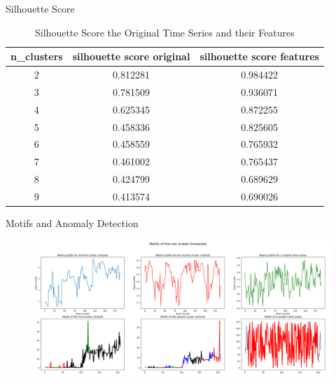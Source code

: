 

\begin{frame}{Silhouette Score}

    \begin{table}[htbp]
        \centering
        \begin{tabular}{|c|c|c|}
          \hline
          \textbf{n\_clusters} & \textbf{silhouette score original} & \textbf{silhouette score features}\\
          \hline
          2 & 0.812281 & 0.984422 \\
          3 & 0.781509 & 0.936071 \\
          4 & 0.625345 & 0.872255 \\
          5 & 0.458336 & 0.825605 \\
          6 & 0.458559 & 0.765932 \\
          7 & 0.461002 & 0.765437 \\
          8 & 0.424799 & 0.689629 \\
          9 & 0.413574 & 0.690026 \\
          \hline
        \end{tabular}
        \label{Silhouette Score for the different Scaling}
        \caption{Silhouette Score the Original Time Series and their Features}
      \end{table}      

\end{frame}
        



\begin{frame}{Motifs and Anomaly Detection}

    \begin{figure}
        \centering
        \includegraphics[width=.99\textwidth]{img/ts/Motifs.png}
      
        \label{MOT}
    \end{figure}
    
    
        
\end{frame}
        

